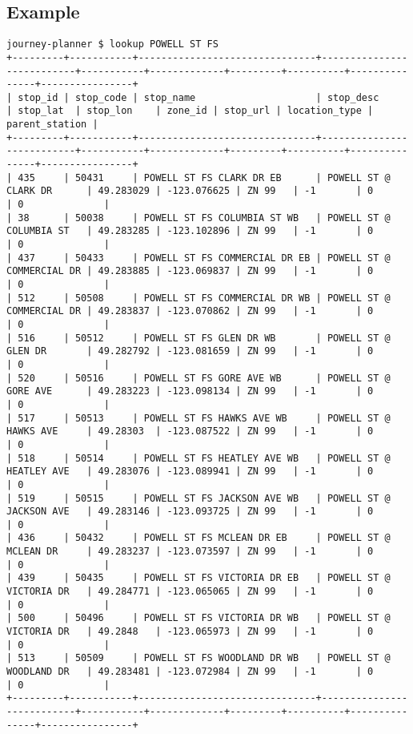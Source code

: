 \documentclass[12pt]{report}
\begin{document}
	\subsection{Example}
	\begin{verbatim}
journey-planner $ lookup POWELL ST FS
+---------+-----------+-------------------------------+---------------------------+-----------+-------------+---------+----------+---------------+----------------+
| stop_id | stop_code | stop_name                     | stop_desc                 | stop_lat  | stop_lon    | zone_id | stop_url | location_type | parent_station |
+---------+-----------+-------------------------------+---------------------------+-----------+-------------+---------+----------+---------------+----------------+
| 435     | 50431     | POWELL ST FS CLARK DR EB      | POWELL ST @ CLARK DR      | 49.283029 | -123.076625 | ZN 99   | -1       | 0             | 0              |
| 38      | 50038     | POWELL ST FS COLUMBIA ST WB   | POWELL ST @ COLUMBIA ST   | 49.283285 | -123.102896 | ZN 99   | -1       | 0             | 0              |
| 437     | 50433     | POWELL ST FS COMMERCIAL DR EB | POWELL ST @ COMMERCIAL DR | 49.283885 | -123.069837 | ZN 99   | -1       | 0             | 0              |
| 512     | 50508     | POWELL ST FS COMMERCIAL DR WB | POWELL ST @ COMMERCIAL DR | 49.283837 | -123.070862 | ZN 99   | -1       | 0             | 0              |
| 516     | 50512     | POWELL ST FS GLEN DR WB       | POWELL ST @ GLEN DR       | 49.282792 | -123.081659 | ZN 99   | -1       | 0             | 0              |
| 520     | 50516     | POWELL ST FS GORE AVE WB      | POWELL ST @ GORE AVE      | 49.283223 | -123.098134 | ZN 99   | -1       | 0             | 0              |
| 517     | 50513     | POWELL ST FS HAWKS AVE WB     | POWELL ST @ HAWKS AVE     | 49.28303  | -123.087522 | ZN 99   | -1       | 0             | 0              |
| 518     | 50514     | POWELL ST FS HEATLEY AVE WB   | POWELL ST @ HEATLEY AVE   | 49.283076 | -123.089941 | ZN 99   | -1       | 0             | 0              |
| 519     | 50515     | POWELL ST FS JACKSON AVE WB   | POWELL ST @ JACKSON AVE   | 49.283146 | -123.093725 | ZN 99   | -1       | 0             | 0              |
| 436     | 50432     | POWELL ST FS MCLEAN DR EB     | POWELL ST @ MCLEAN DR     | 49.283237 | -123.073597 | ZN 99   | -1       | 0             | 0              |
| 439     | 50435     | POWELL ST FS VICTORIA DR EB   | POWELL ST @ VICTORIA DR   | 49.284771 | -123.065065 | ZN 99   | -1       | 0             | 0              |
| 500     | 50496     | POWELL ST FS VICTORIA DR WB   | POWELL ST @ VICTORIA DR   | 49.2848   | -123.065973 | ZN 99   | -1       | 0             | 0              |
| 513     | 50509     | POWELL ST FS WOODLAND DR WB   | POWELL ST @ WOODLAND DR   | 49.283481 | -123.072984 | ZN 99   | -1       | 0             | 0              |
+---------+-----------+-------------------------------+---------------------------+-----------+-------------+---------+----------+---------------+----------------+
	\end{verbatim}
	
\end{document}

